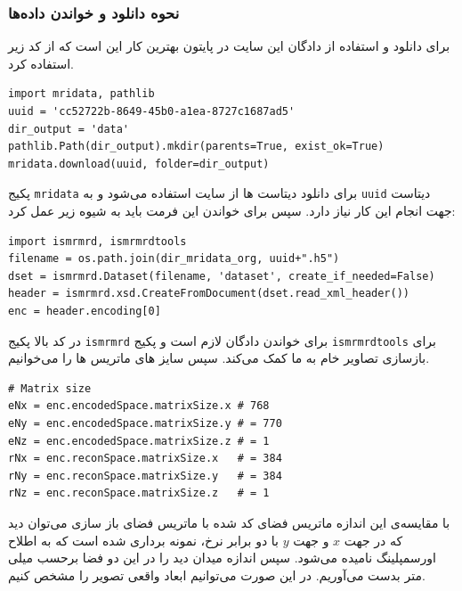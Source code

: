 \subsubsection{نحوه دانلود و خواندن داده‌ها}

برای دانلود و استفاده از دادگان این سایت در پایتون بهترین کار این است که از کد زیر استفاده کرد.


\begin{latin}
\begin{lstlisting}
import mridata, pathlib
uuid = 'cc52722b-8649-45b0-a1ea-8727c1687ad5'
dir_output = 'data'
pathlib.Path(dir_output).mkdir(parents=True, exist_ok=True)
mridata.download(uuid, folder=dir_output)
\end{lstlisting}
\end{latin}

پکیج \texttt{mridata}
برای دانلود دیتاست ها از سایت 
استفاده می‌شود و به \texttt{uuid}
دیتاست جهت انجام این کار نیاز دارد.
سپس برای خواندن این فرمت باید به شیوه زیر عمل کرد:

\begin{latin}
\begin{lstlisting}
import ismrmrd, ismrmrdtools
filename = os.path.join(dir_mridata_org, uuid+".h5")
dset = ismrmrd.Dataset(filename, 'dataset', create_if_needed=False)
header = ismrmrd.xsd.CreateFromDocument(dset.read_xml_header())
enc = header.encoding[0]
\end{lstlisting}
\end{latin}

در کد بالا پکیج \texttt{ismrmrd}
برای خواندن دادگان لازم است و پکیج \texttt{ismrmrdtools}
برای بازسازی تصاویر خام به ما کمک می‌کند. سپس سایز های ماتریس ها را می‌خوانیم.


\begin{latin}
\begin{lstlisting}
# Matrix size
eNx = enc.encodedSpace.matrixSize.x # 768
eNy = enc.encodedSpace.matrixSize.y # = 770
eNz = enc.encodedSpace.matrixSize.z # = 1
rNx = enc.reconSpace.matrixSize.x   # = 384
rNy = enc.reconSpace.matrixSize.y   # = 384
rNz = enc.reconSpace.matrixSize.z   # = 1
\end{lstlisting}
\end{latin}

با مقایسه‌ی این اندازه ماتریس فضای کد شده با ماتریس فضای باز سازی می‌توان دید که در جهت $x$ و جهت $y$ با دو برابر نرخ، نمونه برداری شده است که به اطلاح اورسمپلینگ 
نامیده می‌شود.	سپس اندازه میدان دید را در این دو فضا برحسب میلی متر بدست می‌آوریم. در این صورت می‌توانیم ابعاد واقعی تصویر را مشخص کنیم.

